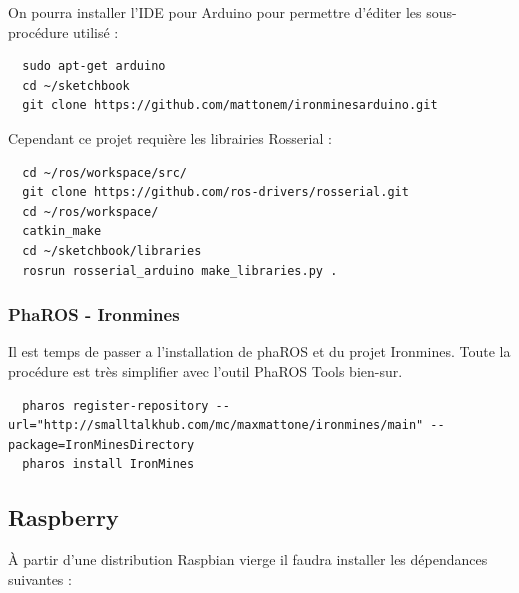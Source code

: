 \documentclass[a4paper, 11pt]{article}
\begin{document}
On pourra installer l'IDE pour Arduino pour permettre d'éditer les
sous-procédure utilisé : 
\begin{lstlisting}
  sudo apt-get arduino
  cd ~/sketchbook
  git clone https://github.com/mattonem/ironminesarduino.git
\end{lstlisting}
Cependant ce projet requière les librairies Rosserial :
\begin{lstlisting}
  cd ~/ros/workspace/src/
  git clone https://github.com/ros-drivers/rosserial.git
  cd ~/ros/workspace/
  catkin_make
  cd ~/sketchbook/libraries
  rosrun rosserial_arduino make_libraries.py .
\end{lstlisting}

\subsubsection{PhaROS - Ironmines}
Il est temps de passer a l'installation de phaROS et du projet
Ironmines. Toute la procédure est très simplifier avec l'outil PhaROS
Tools bien-sur.

\begin{lstlisting}
  pharos register-repository --url="http://smalltalkhub.com/mc/maxmattone/ironmines/main" --package=IronMinesDirectory
  pharos install IronMines
\end{lstlisting}

\subsection{Raspberry}
À partir d'une distribution Raspbian vierge il faudra installer les
dépendances suivantes :
\end{document}
